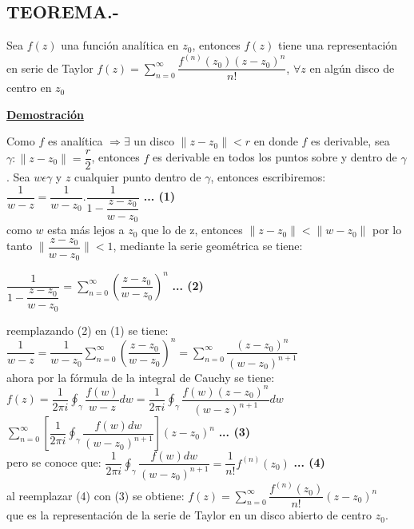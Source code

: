 \documentclass[10pt,a4paper]{article}
\begin{document}
\subsection{TEOREMA.-}
Sea $f(z)$ una función analítica en $z_0$, entonces $f(z)$ tiene una representación en serie de Taylor $\displaystyle{f(z) = \sum_{n=0}^{\infty}\dfrac{f^{(n)}(z_0)(z-z_0)^n}{n!}}$, $\displaystyle{\forall z}$ en algún disco de centro en $z_0$\\
\begin{center}
 \bf \underline{Demostración}
 \end{center} 
 Como $f$ es analítica $\Rightarrow \exists$ un disco $\parallel z- z_0\parallel < r$ en donde $f$ es derivable, sea $\displaystyle{\gamma : \parallel z- z_0\parallel= \dfrac{r}{2}}$, entonces $f$ es derivable en todos los puntos sobre y dentro de $\gamma$.
 Sea $w \epsilon \gamma$ y $z$ cualquier punto dentro de $\gamma$, entonces escribiremos:\\
$\displaystyle{\dfrac{1}{w-z} = \dfrac{1}{w-z_0}. \dfrac{1}{1-\dfrac{z-z_0}{w-z_0}}}$ \textbf{... (1)}\\
como $w$ esta más lejos a $z_0$ que lo de z, entonces $\parallel  z - z_0\parallel < \parallel w - z_0 \parallel$ por lo tanto $\parallel \dfrac{z-z_0}{w-z_0} \parallel < 1$, mediante la serie geométrica se tiene:\\
\begin{center}
$\displaystyle{\dfrac{1}{1-\dfrac{z-z_0}{w-z_0}}= \sum_{n=0}^{\infty} (\dfrac{z - z_0}{w - z_0})^n}$ \textbf{... (2)}
\end{center}
reemplazando (2) en (1) se tiene: $\displaystyle{\dfrac{1}{w-z}= \dfrac{1}{w-z_0}\sum_{n=0}^{\infty} (\dfrac{z - z_0}{w - z_0})^n = \sum_{n=0}^{\infty} \dfrac{(z - z_0)^n}{(w - z_0)^{n+1}}}$ \\ ahora por la fórmula de la integral de Cauchy se tiene: \\
$\displaystyle{f(z) = \dfrac{1}{2 \pi i} \oint_\gamma \dfrac{f(w)}{w-z} dw = \dfrac{1}{2 \pi i} \oint_\gamma \dfrac{f(w)(z-z_0)^n}{(w-z)^{n+1}} dw }$\\
$\displaystyle{\sum_{n=0}^{\infty} [ \dfrac{1}{2 \pi i} \oint_\gamma \dfrac{f(w) dw}{(w-z_0)^{n+1}}] (z-z_0)^n}$ \textbf{... (3)}\\
pero se conoce que: $\displaystyle{\dfrac{1}{2 \pi i} \oint_\gamma \dfrac{f(w) dw}{(w-z_0)^{n+1}} = \dfrac{1}{n!} f^{(n)}(z_0)}$ \textbf{... (4)}\\
al reemplazar (4) con (3) se obtiene: $\displaystyle{f(z) = \sum_{n = 0}^{\infty} \dfrac{f^{(n)} (z_0)}{n!} (z-z_0)^n}$\\
que es la representación de la serie de Taylor en un disco abierto de centro $z_0$.
\end{document}
